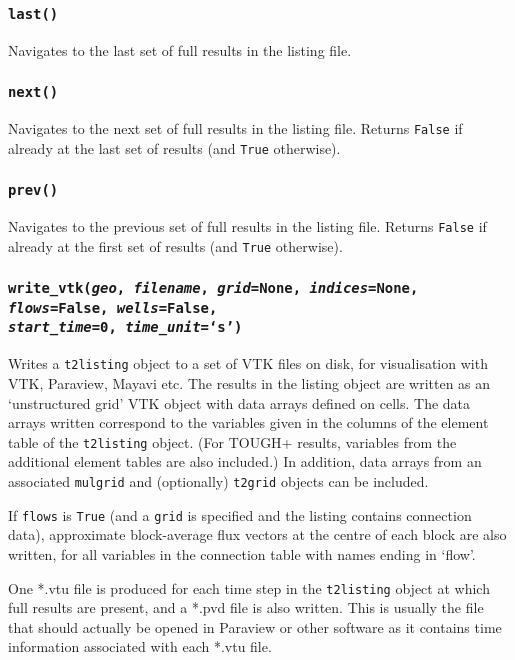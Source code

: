 \subsubsection{\texttt{last()}}

Navigates to the last set of full results in the listing file.

\subsubsection{\texttt{next()}}

Navigates to the next set of full results in the listing file.  Returns \texttt{False} if already at the last set of results (and \texttt{True} otherwise).

\subsubsection{\texttt{prev()}}

Navigates to the previous set of full results in the listing file.  Returns \texttt{False} if already at the first set of results (and \texttt{True} otherwise).

\subsubsection{\texttt{write\_vtk(\emph{geo}, \emph{filename}, \emph{grid}=None, \emph{indices}=None, \emph{flows}=False,
\emph{wells}=False,\\
\emph{start\_time}=0, \emph{time\_unit}=`s')}}

Writes a \texttt{t2listing} object to a set of VTK files on disk, for visualisation with VTK, Paraview, Mayavi etc.  The results in the listing object are written as an `unstructured grid' VTK object with data arrays defined on cells.  The data arrays written correspond to the variables given in the columns of the element table of the \texttt{t2listing} object.  (For TOUGH+ results, variables from the additional element tables are also included.) In addition, data arrays from an associated \texttt{mulgrid} and (optionally) \texttt{t2grid} objects can be included.

If \texttt{flows} is \texttt{True} (and a \texttt{grid} is specified and the listing contains connection data), approximate block-average flux vectors at the centre of each block are also written, for all variables in the connection table with names ending in `flow'.

One *.vtu file is produced for each time step in the \texttt{t2listing} object at which full results are present, and a *.pvd file is also written.  This is usually the file that should actually be opened in Paraview or other software as it contains time information associated with each *.vtu file.

